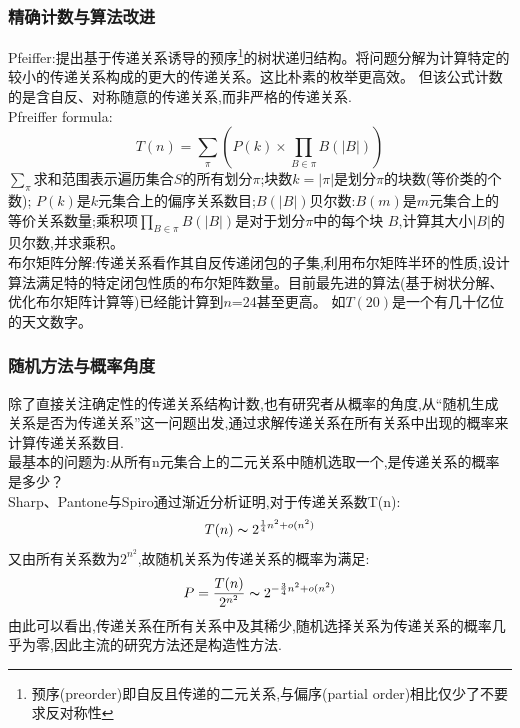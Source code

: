 \documentclass[12pt]{article}
\theoremstyle{definition}
\begin{document}
\subsubsection{精确计数与算法改进}\cite{fischer1971boolean}
Pfeiffer:提出基于传递关系诱导的预序\footnote{预序(preorder)即自反且传递的二元关系,与偏序(partial order)相比仅少了不要求反对称性}的树状递归结构。将问题分解为计算特定的较小的传递关系构成的更大的传递关系。这比朴素的枚举更高效。
但该公式计数的是含自反、对称随意的传递关系,而非严格的传递关系.
\\
Pfreiffer formula:\\
\[
T(n)=\sum_{\pi}^{}(P(k)\times \prod_{B\in \pi}^{} B(\left | B \right | ))
\]
\hspace*{2em}$\sum_{\pi}^{}$求和范围表示遍历集合$S$的所有划分$\pi$;块数$k=\left | \pi \right |$是划分$\pi$的块数(等价类的个数);
$P(k)$是$k$元集合上的偏序关系数目;$B(\left | B \right |)$贝尔数:$B(m)$是$m$元集合上的等价关系数量;乘积项$\prod_{B \in \pi}^{}B(\left | B \right |)$是对于划分$\pi$中的每个块
$B$,计算其大小$\left | B \right |$的贝尔数,并求乘积。\\
\hspace*{2em}布尔矩阵分解:传递关系看作其自反传递闭包的子集,利用布尔矩阵半环的性质,设计算法满足特的特定闭包性质的布尔矩阵数量。目前最先进的算法(基于树状分解、优化布尔矩阵计算等)已经能计算到$n$=24甚至更高。
如$T(20)$是一个有几十亿位的天文数字。
\subsubsection{随机方法与概率角度}
除了直接关注确定性的传递关系结构计数,也有研究者从概率的角度,从“随机生成关系是否为传递关系”这一问题出发,通过求解传递关系在所有关系中出现的概率来计算传递关系数目.\\
\hspace*{2em}最基本的问题为:从所有n元集合上的二元关系中随机选取一个,是传递关系的概率是多少？\\
Sharp、Pantone与Spiro通过渐近分析证明,对于传递关系数T(n):
\[
T(n)\thicksim 2^{\frac{1}{4}n^{2}+o(n^{2})}
\]
又由所有关系数为$2^{n^{2}}$,故随机关系为传递关系的概率为满足:
\[
P=\frac{T(n)}{2^{n^{2}}}\thicksim 2^{-\frac{3}{4}n^{2}+o(n^{2})}
\]
由此可以看出,传递关系在所有关系中及其稀少,随机选择关系为传递关系的概率几乎为零,因此主流的研究方法还是构造性方法.\cite{panto2019asymptotic}
\end{document}
